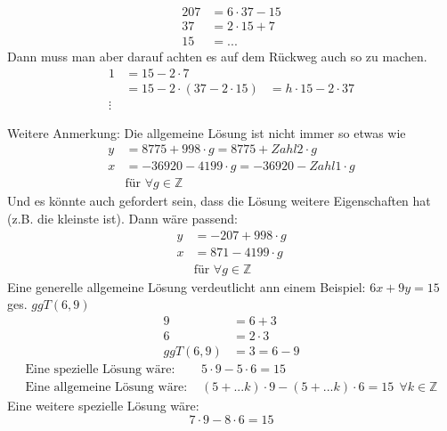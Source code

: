\documentclass{article} %
\begin{document}
\begin{enumerate}
\begin{mybox}
\begin{align*}
            207 & = 6 \cdot 37 -15 \\
            37 & = 2 \cdot 15 +7 \\
            15 & = ...
        \end{align*}
        Dann muss man aber darauf achten es auf dem Rückweg auch so zu machen. 
\begin{align*}
    1 & = 15 - 2 \cdot 7 \\
    & = 15 -2 \cdot ( 37 - 2 \cdot 15) & = h \cdot 15 - 2 \cdot 37 \\
    \vdots
\end{align*}\color{black}
        \end{mybox}
        \newpage
        \begin{mybox}
        \color{Blue}
        Weitere Anmerkung: Die allgemeine Lösung ist nicht immer so etwas wie
        \begin{align*}
            y & = 8775 + 998 \cdot g  = 8775 + Zahl2 \cdot g \\
            x & = - 36920 - 4199 \cdot g   = - 36920 - Zahl1 \cdot g \\
            & \text{für } \forall g \in \mathbb{Z}
        \end{align*} 
        Und es könnte auch gefordert sein, dass die Lösung weitere Eigenschaften hat (z.B. die kleinste ist). Dann wäre passend: 
        \begin{align*}
            y &  = -207 + 998 \cdot g \\
            x &  = 871 - 4199 \cdot g \\
            & \text{für } \forall g \in \mathbb{Z}
        \end{align*} 
        Eine generelle allgemeine Lösung verdeutlicht ann einem Beispiel: $6x+9y= 15$ \\
        ges. $ggT(6,9)$ 
        \begin{align*}
            9 &= 6+3 \\
            6 & = 2 \cdot 3 \\
            ggT(6,9) &= 3 = 6-9 
        \end{align*}
        \begin{align*}
            \text{Eine spezielle Lösung wäre: } & 5 \cdot 9 - 5 \cdot 6 = 15 \\
            \text{Eine allgemeine Lösung wäre: } & (5 + ...k)  \cdot 9 - (5 + ...k) \cdot 6 = 15 \ \ \forall k \in \mathbb{Z}
        \end{align*}
        Eine weitere spezielle Lösung wäre: 
        \[  7 \cdot 9 - 8 \cdot 6 = 15 \]

\end{mybox}
\end{enumerate}
\end{document}
